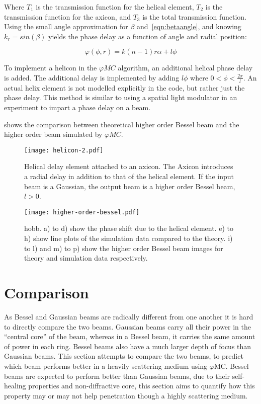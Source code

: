 Where $T_1$ is the transmission function for the helical element, $T_2$ is the transmission function for the axicon, and $T_3$ is the total transmission function.
Using the small angle approximation  for $\beta$ and~\cref{eqn:betaangle}, and knowing $k_r=sin\left(\beta\right)$ yields the phase delay as a function of angle and radial position:

\begin{equation}
\varphi(\phi,r)=k(n-1)r\alpha+l\phi
\end{equation}

To implement a helicon in the $\varphi MC$ algorithm, an additional helical phase delay is added.
The additional delay is implemented by adding $l\phi$ where $0<\phi<\tfrac{2\pi}{l}$.
An actual helix element is not modelled explicitly in the code, but rather just the phase delay.
This method is similar to using a spatial light modulator in an experiment to impart a phase delay on a beam.

 shows the comparison between theoretical higher order Bessel beam and the higher order beam simulated by $\varphi MC$.

\begin{figure}[!ht]
    \centering
    \texttt{[image: helicon-2.pdf]}
    \caption{Helical delay element attached to an axicon. The Axicon introduces a radial delay in addition to that of the helical element. If the input beam is a Gaussian, the output beam is a higher order Bessel beam, $l>0$.}
    \label{fig:helix-2}
    \vspace{-10pt}
\end{figure}

\begin{figure}[!ht]
    \centering
    \texttt{[image: higher-order-bessel.pdf]}
    \caption{\Gls*{hobb}. a) to d) show the phase shift due to the helical element. e) to h) show line plots of the simulation data compared to the theory. i) to l) and m) to p) show the higher order Bessel beam images for theory and simulation data respectively.}
    \label{fig:highordershow}
\end{figure}

\FloatBarrier
\section{Comparison}
\label{sec:compBeams}
As Bessel and Gaussian beams are radically different from one another it is hard to directly compare the two beams.
Gaussian beams carry all their power in the ``central core'' of the beam, whereas in a Bessel beam, it carries the same amount of power in each ring.
Bessel beams also have a much larger depth of focus than Gaussian beams.
This section attempts to compare the two beams, to predict which beam performs better in a heavily scattering medium using $\varphi$MC\@.
Bessel beams are expected to perform better than Gaussian beams, due to their self-healing properties and non-diffractive core, this section aims to quantify how this property may or may not help penetration though a highly scattering medium. 


